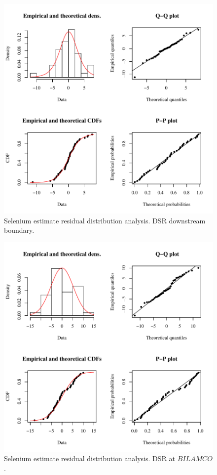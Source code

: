 \begin{figure}[htbp]
	\begin{center}
	\includegraphics[width=6in]{"Figures/Results_DSR/Conc Model res-fit D106C"}
	\caption{Selenium estimate residual distribution analysis.  DSR downstream boundary.}
	\end{center}
\end{figure}
\newpage

\begin{figure}[htbp]
	\begin{center}
	\includegraphics[width=6in]{"Figures/Results_DSR/Conc Model res-fit BIG"}
	\caption{Selenium estimate residual distribution analysis.  DSR at $BILAMCO$.}
	\end{center}
\end{figure}
\newpage

